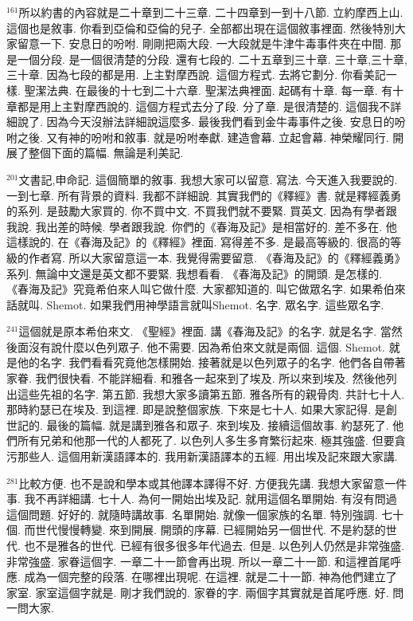 \documentclass{book}
\begin{document}
$^{161}$所以約書的內容就是二十章到二十三章.
二十四章到一到十八節.
立約摩西上山.
這個也是敘事.
你看到亞倫和亞倫的兒子.
全部都出現在這個敘事裡面.
然後特別大家留意一下.
安息日的吩咐.
剛剛把兩大段.
一大段就是牛津牛毒事件夾在中間.
那是一個分段.
是一個很清楚的分段.
還有七段的.
二十五章到三十章.
三十章,三十章,三十章.
因為七段的都是用.
上主對摩西說.
這個方程式.
去將它劃分.
你看美記一樣.
聖潔法典.
在最後的十七到二十六章.
聖潔法典裡面.
起碼有十章.
每一章.
有十章都是用上主對摩西說的.
這個方程式去分了段.
分了章.
是很清楚的.
這個我不詳細說了.
因為今天沒辦法詳細說這麼多.
最後我們看到金牛毒事件之後.
安息日的吩咐之後.
又有神的吩咐和敘事.
就是吩咐奉獻.
建造會幕.
立起會幕.
神榮耀同行.
開展了整個下面的篇幅.
無論是利美記.

$^{201}$文書記,申命記.
這個簡單的敘事.
我想大家可以留意.
寫法.
今天進入我要說的.
一到七章.
所有背景的資料.
我都不詳細說.
其實我們的《釋經》書.
就是釋經義勇的系列.
是鼓勵大家買的.
你不買中文.
不買我們就不要緊.
買英文.
因為有學者跟我說.
我出差的時候.
學者跟我說.
你們的《春海及記》是相當好的.
差不多在.
他這樣說的.
在《春海及記》的《釋經》裡面.
寫得差不多.
是最高等級的.
很高的等級的作者寫.
所以大家留意這一本.
我覺得需要留意.
《春海及記》的《釋經義勇》系列.
無論中文還是英文都不要緊.
我想看看.
《春海及記》的開頭.
是怎樣的.
《春海及記》究竟希伯來人叫它做什麼.
大家都知道的.
叫它做眾名字.
如果希伯來話就叫.
Shemot.
如果我們用神學語言就叫Shemot.
名字.
眾名字.
這些眾名字.

$^{241}$這個就是原本希伯來文.
《聖經》裡面.
講《春海及記》的名字.
就是名字.
當然後面沒有說什麼以色列眾子.
他不需要.
因為希伯來文就是兩個.
這個.
Shemot.
就是他的名字.
我們看看究竟他怎樣開始.
接著就是以色列眾子的名字.
他們各自帶著家眷.
我們很快看.
不能詳細看.
和雅各一起來到了埃及.
所以來到埃及.
然後他列出這些先祖的名字.
第五節.
我想大家多讀第五節.
雅各所有的親骨肉.
共計七十人.
那時約瑟已在埃及.
到這裡.
即是說整個家族.
下來是七十人.
如果大家記得.
是創世記的.
最後的篇幅.
就是講到雅各和眾子.
來到埃及.
接續這個故事.
約瑟死了.
他們所有兄弟和他那一代的人都死了.
以色列人多生多育繁衍起來.
極其強盛.
但要貪污那些人.
這個用新漢語譯本的.
我用新漢語譯本的五經.
用出埃及記來跟大家講.

$^{281}$比較方便.
也不是說和學本或其他譯本譯得不好.
方便我先講.
我想大家留意一件事.
我不再詳細講.
七十人.
為何一開始出埃及記.
就用這個名單開始.
有沒有問過這個問題.
好好的.
就隨時講故事.
名單開始.
就像一個家族的名單.
特別強調.
七十個.
而世代慢慢轉變.
來到開展.
開頭的序幕.
已經開始另一個世代.
不是約瑟的世代.
也不是雅各的世代.
已經有很多很多年代過去.
但是.
以色列人仍然是非常強盛.
非常強盛.
家眷這個字.
一章二十一節會再出現.
所以一章二十一節.
和這裡首尾呼應.
成為一個完整的段落.
在哪裡出現呢.
在這裡.
就是二十一節.
神為他們建立了家室.
家室這個字就是.
剛才我們說的.
家眷的字.
兩個字其實就是首尾呼應.
好.
問一問大家.
\end{document}
